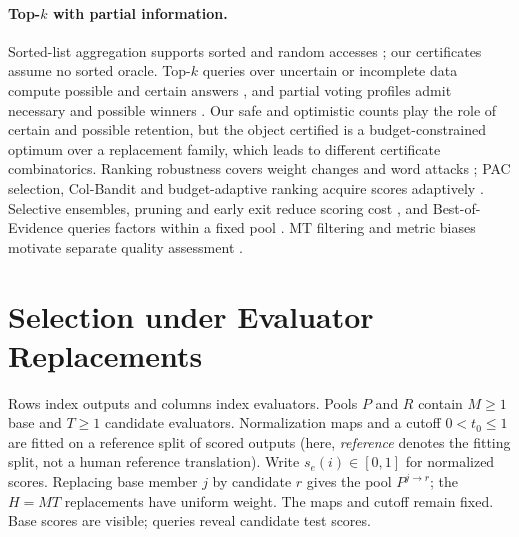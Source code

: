 \documentclass[11pt]{article}
\begin{document}
\paragraph{Top-$k$ with partial information.} Sorted-list aggregation supports sorted and random accesses \citep{fagin2003middleware}; our certificates assume no sorted oracle. Top-$k$ queries over uncertain or incomplete data compute possible and certain answers \citep{imielinski1984incomplete,soliman2007uncertaintopk,amarilli2017topk}, and partial voting profiles admit necessary and possible winners \citep{imber2020topk}. Our safe and optimistic counts play the role of certain and possible retention, but the object certified is a budget-constrained optimum over a replacement family, which leads to different certificate combinatorics. Ranking robustness covers weight changes and word attacks \citep{asudeh2018stable,wu2022wordsub}; PAC selection, Col-Bandit and budget-adaptive ranking acquire scores adaptively \citep{kalyanakrishnan2012pac,pony2026colbandit,oettershagen2026topk}. Selective ensembles, pruning and early exit reduce scoring cost \citep{black2022selective,li2022pruning,inoue2019adaptive,busolin2021earlyexit}, and Best-of-Evidence queries factors within a fixed pool \citep{zhang2026bestofevidence}. MT filtering and metric biases motivate separate quality assessment \citep{perrella2024beyond,shayegh2025adequacy}.

\section{Selection under Evaluator Replacements}
\label{sec:setup}
Rows index outputs and columns index evaluators. Pools $P$ and $R$ contain $M\ge1$ base and $T\ge1$ candidate evaluators. Normalization maps and a cutoff $0<t_0\le1$ are fitted on a reference split of scored outputs (here, \emph{reference} denotes the fitting split, not a human reference translation). Write $s_e(i)\in[0,1]$ for normalized scores. Replacing base member $j$ by candidate $r$ gives the pool $P^{j\to r}$; the $H=MT$ replacements have uniform weight. The maps and cutoff remain fixed. Base scores are visible; queries reveal candidate test scores.
\end{document}
